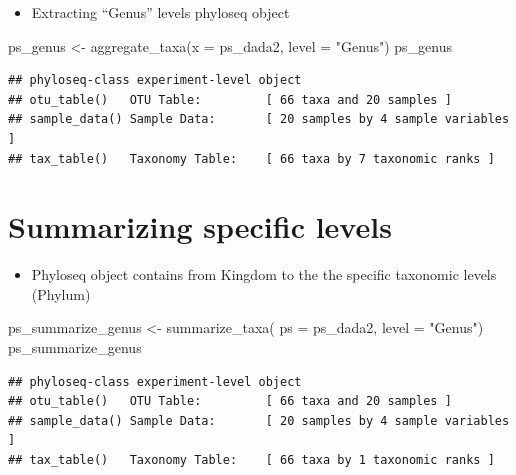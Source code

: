 \documentclass[
]{book}
\newenvironment{Shaded}{\begin{snugshade}}{\end{snugshade}}
\newcommand{\AttributeTok}[1]{\textcolor[rgb]{0.77,0.63,0.00}{#1}}
\newcommand{\FunctionTok}[1]{\textcolor[rgb]{0.00,0.00,0.00}{#1}}
\newcommand{\NormalTok}[1]{#1}
\newcommand{\OtherTok}[1]{\textcolor[rgb]{0.56,0.35,0.01}{#1}}
\newcommand{\StringTok}[1]{\textcolor[rgb]{0.31,0.60,0.02}{#1}}
\providecommand{\tightlist}{%
  \setlength{\itemsep}{0pt}\setlength{\parskip}{0pt}}
\begin{document}
\begin{itemize}
\tightlist
\item
  Extracting ``Genus'' levels phyloseq object
\end{itemize}

\begin{Shaded}
\begin{Highlighting}[]
\NormalTok{ps\_genus }\OtherTok{\textless{}{-}} \FunctionTok{aggregate\_taxa}\NormalTok{(}\AttributeTok{x =}\NormalTok{ ps\_dada2, }
                           \AttributeTok{level =} \StringTok{"Genus"}\NormalTok{)}
\NormalTok{ps\_genus}
\end{Highlighting}
\end{Shaded}

\begin{verbatim}
## phyloseq-class experiment-level object
## otu_table()   OTU Table:         [ 66 taxa and 20 samples ]
## sample_data() Sample Data:       [ 20 samples by 4 sample variables ]
## tax_table()   Taxonomy Table:    [ 66 taxa by 7 taxonomic ranks ]
\end{verbatim}

\hypertarget{summarizing-specific-levels}{%
\section{Summarizing specific levels}\label{summarizing-specific-levels}}

\begin{itemize}
\tightlist
\item
  Phyloseq object contains from Kingdom to the the specific taxonomic levels (Phylum)
\end{itemize}

\begin{Shaded}
\begin{Highlighting}[]
\NormalTok{ps\_summarize\_genus }\OtherTok{\textless{}{-}} \FunctionTok{summarize\_taxa}\NormalTok{(}
    \AttributeTok{ps =}\NormalTok{ ps\_dada2, }
    \AttributeTok{level =} \StringTok{"Genus"}\NormalTok{)}
\NormalTok{ps\_summarize\_genus}
\end{Highlighting}
\end{Shaded}

\begin{verbatim}
## phyloseq-class experiment-level object
## otu_table()   OTU Table:         [ 66 taxa and 20 samples ]
## sample_data() Sample Data:       [ 20 samples by 4 sample variables ]
## tax_table()   Taxonomy Table:    [ 66 taxa by 1 taxonomic ranks ]
\end{verbatim}
\end{document}
